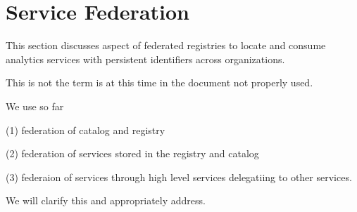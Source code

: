 
\section{Service Federation}
\label{sec:federation}


This section discusses aspect of federated registries to locate and
consume analytics services with persistent identifiers across
organizations.


This is not the term is at this time in the document not properly used.

We use so far 

(1) federation of catalog and registry

(2) federation of services stored in the registry and catalog

(3) federaion of services through high level services delegatiing to other services. 

We will clarify this and appropriately address.
